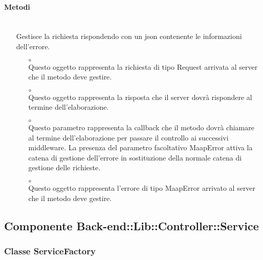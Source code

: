 \paragraph*{Metodi}
\begin{itemize}
\item[]  \\ Gestisce la richiesta rispondendo con un json contenente le informazioni dell'errore.
\begin{itemize}\addtolength{\itemsep}{-0.5\baselineskip}
\item[$\circ$]  \\ Questo oggetto rappresenta la richiesta di tipo Request arrivata al server che il metodo deve gestire.
\item[$\circ$]  \\ Questo oggetto rappresenta la risposta che il server dovrà rispondere al termine dell'elaborazione.
\item[$\circ$]  \\ Questo parametro rappresenta la callback che il metodo dovrà chiamare al termine dell'elaborazione per passare il controllo ai successivi middleware. La presenza del parametro facoltativo MaapError attiva la catena di gestione dell'errore in sostituzione della normale catena di gestione delle richieste.
\item[$\circ$]  \\ Questo oggetto rappresenta l'errore di tipo MaapError arrivato al server che il metodo deve gestire.
\end{itemize}
\end{itemize}

\subsection{Componente Back-end::Lib::Controller::Service}

\subsubsection{Classe ServiceFactory}


